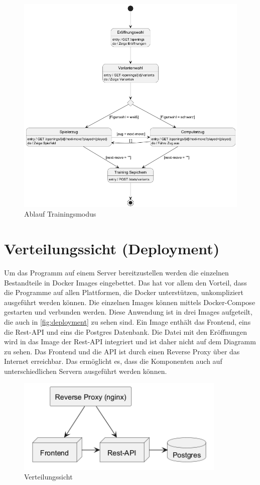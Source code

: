 \begin{figure}
    \includegraphics[width=\linewidth]{images/diagrams/sd_training}
    \caption{Ablauf Trainingsmodus}
    \label{fig:sd_training}
\end{figure}


\section{Verteilungssicht (Deployment)}
Um das Programm auf einem Server bereitzustellen werden die einzelnen Bestandteile in Docker Images eingebettet. Das hat vor allem den Vorteil, dass die Programme auf allen Plattformen, die Docker unterstützen, unkompliziert ausgeführt werden können. Die einzelnen Images können mittels Docker-Compose gestarten und verbunden werden. Diese Anwendung ist in drei Images aufgeteilt, die auch in \autoref{fig:deployment} zu sehen sind. Ein Image enthält das Frontend, eins die Rest-API und eins die Postgres Datenbank. Die Datei mit den Eröffnungen wird in das Image der Rest-API integriert und ist daher nicht auf dem Diagramm zu sehen. Das Frontend und die API ist durch einen Reverse Proxy über das Internet erreichbar. Das ermöglicht es, dass die Komponenten auch auf unterschiedlichen Servern ausgeführt werden können.
 
\begin{figure}[h]
    \centering
    \includegraphics[width=10cm]{images/diagrams/deployment}
    \caption{Verteilungssicht}
    \label{fig:deployment}
\end{figure}

